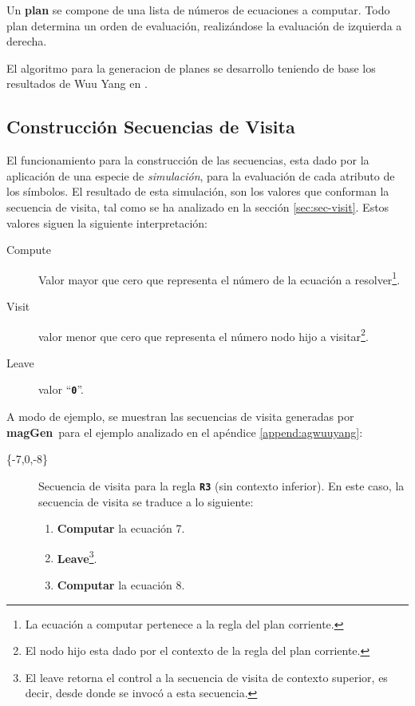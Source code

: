 \documentclass[runningheads,a4paper]{llncs}
\newcommand{\textbtt}[1]{\texttt{\textbf{#1}}}
\newcommand{\maggen}{\textbf{magGen}}
\begin{document}
Un \textbf{plan} se compone de una lista de números de ecuaciones a computar. Todo plan determina un orden de evaluación, realizándose la evaluación de izquierda a derecha.

El algoritmo para la generacion de planes se desarrollo teniendo de base los resultados de Wuu Yang en \cite{wuu-yang1}.


\subsection{Construcción Secuencias de Visita}
\label{seubsec:seq-visit}
El funcionamiento para la construcción de las secuencias, esta dado por la aplicación de una especie de \textit{simulación}, para la evaluación de cada atributo de los símbolos. El resultado de esta simulación, son los valores que conforman la secuencia de visita, tal como se ha analizado en la sección \ref{sec:sec-visit}. Estos valores siguen la siguiente interpretación: 

\begin{description}
\item [Compute] Valor mayor que cero que representa el número de la ecuación a resolver\footnote{La ecuación a computar pertenece a la regla del plan corriente.}.
\item [Visit] valor menor que cero que representa el número nodo hijo a visitar\footnote{El nodo hijo esta dado por el contexto de la regla del plan corriente.}.
\item [Leave] valor ``\textbtt{0}''.
\end{description}

A modo de ejemplo, se muestran las secuencias de visita generadas por \maggen\ para el ejemplo analizado en el apéndice \ref{append:agwuuyang}:

\begin{description}
\item [\{-7,0,-8\}] Secuencia de visita para la regla \textbtt{R3} (sin contexto inferior). En este caso, la secuencia de visita se traduce a lo siguiente:

\begin{enumerate}
\item \textbf{Computar} la ecuación 7.
\item \textbf{Leave}\footnote{El leave retorna el control a la secuencia de visita de contexto superior, es decir, desde donde se invocó a esta secuencia.}.
\item \textbf{Computar} la ecuación 8.
\end{enumerate}

\end{description}
\end{document}
